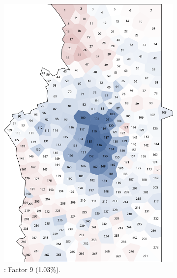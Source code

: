 \documentclass[output=paper]{LSP/langsci}
\begin{document}
\begin{figure}
\begin{subfigure}[t]{0.3\textwidth}
\includegraphics[width=\textwidth]{illustrations/pickl_fig13}
\caption{: Factor 9 (1.03\%).}
\label{fig:pickl:13}
\end{subfigure}  
~
\begin{subfigure}[t]{0.3\textwidth}

\end{subfigure}
\end{figure}
\end{document}
